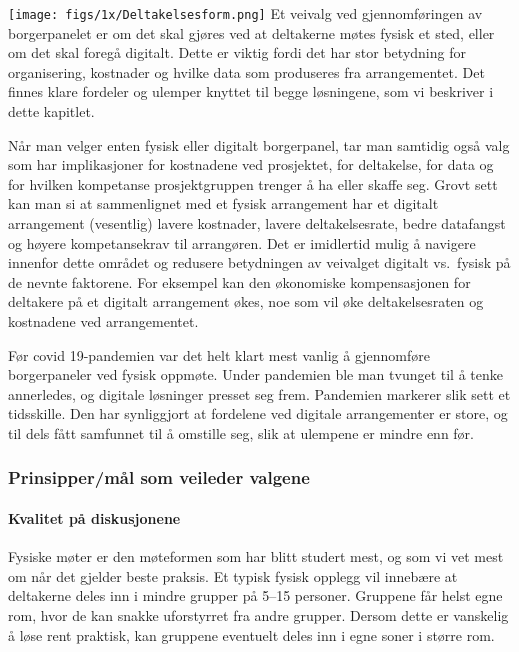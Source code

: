 \documentclass[
  12pt,
  a4paper, 12pt]{article}
\begin{document}
\texttt{[image: figs/1x/Deltakelsesform.png]}
Et veivalg ved gjennomføringen av borgerpanelet er om det skal gjøres ved at deltakerne møtes fysisk et sted, eller om det skal foregå digitalt. Dette er viktig fordi det har stor betydning for organisering, kostnader og hvilke data som produseres fra arrangementet. Det finnes klare fordeler og ulemper knyttet til begge løsningene, som vi beskriver i dette kapitlet.

Når man velger enten fysisk eller digitalt borgerpanel, tar man samtidig også valg som har implikasjoner for kostnadene ved prosjektet, for deltakelse, for data og for hvilken kompetanse prosjektgruppen trenger å ha eller skaffe seg. Grovt sett kan man si at sammenlignet med et fysisk arrangement har et digitalt arrangement (vesentlig) lavere kostnader, lavere deltakelsesrate, bedre datafangst og høyere kompetansekrav til arrangøren. Det er imidlertid mulig å navigere innenfor dette området og redusere betydningen av veivalget digitalt vs.~fysisk på de nevnte faktorene. For eksempel kan den økonomiske kompensasjonen for deltakere på et digitalt arrangement økes, noe som vil øke deltakelsesraten og kostnadene ved arrangementet.

Før covid 19-pandemien var det helt klart mest vanlig å gjennomføre borgerpaneler ved fysisk oppmøte. Under pandemien ble man tvunget til å tenke annerledes, og digitale løsninger presset seg frem. Pandemien markerer slik sett et tidsskille. Den har synliggjort at fordelene ved digitale arrangementer er store, og til dels fått samfunnet til å omstille seg, slik at ulempene er mindre enn før.

\hypertarget{prinsippermuxe5l-som-veileder-valgene}{%
\subsubsection{Prinsipper/mål som veileder valgene}\label{prinsippermuxe5l-som-veileder-valgene}}

\hypertarget{kvalitet-puxe5-diskusjonene}{%
\paragraph{Kvalitet på diskusjonene}\label{kvalitet-puxe5-diskusjonene}}

Fysiske møter er den møteformen som har blitt studert mest, og som vi vet mest om når det gjelder beste praksis. Et typisk fysisk opplegg vil innebære at deltakerne deles inn i mindre grupper på 5--15 personer. Gruppene får helst egne rom, hvor de kan snakke uforstyrret fra andre grupper. Dersom dette er vanskelig å løse rent praktisk, kan gruppene eventuelt deles inn i egne soner i større rom.
\end{document}
